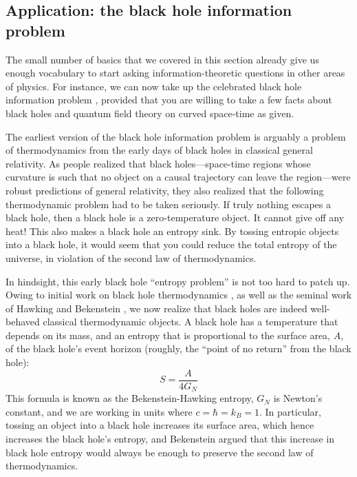 \documentclass[a4paper,11pt]{article}
\begin{document}
\subsection{Application: the black hole information problem}

The small number of basics that we covered in this section already give us enough vocabulary to start asking information-theoretic questions in other areas of physics.
For instance, we can now take up the celebrated black hole information problem \cite{Mathur:2009hf,Polchinski:2016hrw,Harlow:2014yka}, provided that you are willing to take a few facts about black holes and quantum field theory on curved space-time as given.

The earliest version of the black hole information problem is arguably a problem of thermodynamics from the early days of black holes in classical general relativity.
As people realized that black holes---space-time regions whose curvature is such that no object on a causal trajectory can leave the region---were robust predictions of general relativity, they also realized that the following thermodynamic problem had to be taken seriously.
If truly nothing escapes a black hole, then a black hole is a zero-temperature object.
It cannot give off any heat!
This also makes a black hole an entropy sink.
By tossing entropic objects into a black hole, it would seem that you could reduce the total entropy of the universe, in violation of the second law of thermodynamics.

In hindsight, this early black hole ``entropy problem'' is not too hard to patch up.
Owing to initial work on black hole thermodynamics \cite{bardeen1973}, as well as the seminal work of Hawking and Bekenstein \cite{Hawking:1974sw,Bekenstein:1980jp}, we now realize that black holes are indeed well-behaved classical thermodynamic objects.
A black hole has a temperature that depends on its mass, and an entropy that is proportional to the surface area, $A$, of the black hole's event horizon (roughly, the ``point of no return'' from the black hole):
\begin{equation}
S = \frac{A}{4 G_N}
\end{equation}
This formula is known as the Bekenstein-Hawking entropy, $G_N$ is Newton's constant, and we are working in units where $c = \hbar = k_B = 1$.
In particular, tossing an object into a black hole increases its surface area, which hence increases the black hole's entropy, and Bekenstein argued that this increase in black hole entropy would always be enough to preserve the second law of thermodynamics.
\end{document}
